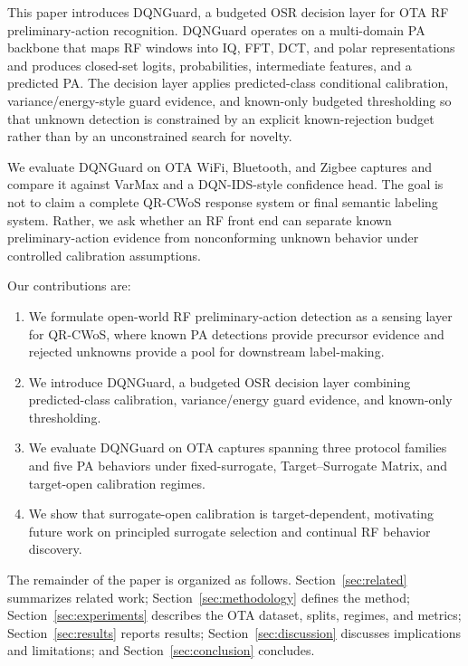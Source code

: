 This paper introduces DQNGuard, a budgeted OSR decision layer for OTA RF preliminary-action recognition. DQNGuard operates on a multi-domain PA backbone that maps RF windows into IQ, FFT, DCT, and polar representations and produces closed-set logits, probabilities, intermediate features, and a predicted PA. The decision layer applies predicted-class conditional calibration, variance/energy-style guard evidence, and known-only budgeted thresholding so that unknown detection is constrained by an explicit known-rejection budget rather than by an unconstrained search for novelty.

We evaluate DQNGuard on OTA WiFi, Bluetooth, and Zigbee captures and compare it against VarMax and a DQN-IDS-style confidence head. The goal is not to claim a complete QR-CWoS response system or final semantic labeling system. Rather, we ask whether an RF front end can separate known preliminary-action evidence from nonconforming unknown behavior under controlled calibration assumptions.

Our contributions are:
\begin{enumerate}
    \item We formulate open-world RF preliminary-action detection as a sensing layer for QR-CWoS, where known PA detections provide precursor evidence and rejected unknowns provide a pool for downstream label-making.
    \item We introduce DQNGuard, a budgeted OSR decision layer combining predicted-class calibration, variance/energy guard evidence, and known-only thresholding.
    \item We evaluate DQNGuard on OTA captures spanning three protocol families and five PA behaviors under fixed-surrogate, Target--Surrogate Matrix, and target-open calibration regimes.
    \item We show that surrogate-open calibration is target-dependent, motivating future work on principled surrogate selection and continual RF behavior discovery.
\end{enumerate}

The remainder of the paper is organized as follows. Section~\ref{sec:related} summarizes related work; Section~\ref{sec:methodology} defines the method; Section~\ref{sec:experiments} describes the OTA dataset, splits, regimes, and metrics; Section~\ref{sec:results} reports results; Section~\ref{sec:discussion} discusses implications and limitations; and Section~\ref{sec:conclusion} concludes.
